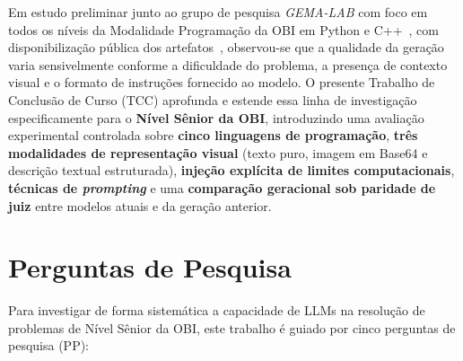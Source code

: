 Em estudo preliminar junto ao grupo de pesquisa \textit{GEMA-LAB} com foco em todos os níveis da Modalidade Programação da OBI em Python e C++~\citep{angelo2026ise}, com disponibilização pública dos artefatos~\citep{obibenchmarking2026,problems2026}, observou-se que a qualidade da geração varia sensivelmente conforme a dificuldade do problema, a presença de contexto visual e o formato de instruções fornecido ao modelo. O presente Trabalho de Conclusão de Curso (TCC) aprofunda e estende essa linha de investigação especificamente para o \textbf{Nível Sênior da OBI}, introduzindo uma avaliação experimental controlada sobre \textbf{cinco linguagens de programação}, \textbf{três modalidades de representação visual} (texto puro, imagem em Base64 e descrição textual estruturada), \textbf{injeção explícita de limites computacionais}, \textbf{técnicas de \textit{prompting}} e uma \textbf{comparação geracional sob paridade de juiz} entre modelos atuais e da geração anterior.

\section{Perguntas de Pesquisa}\label{sec:intro-rqs}

Para investigar de forma sistemática a capacidade de LLMs na resolução de problemas de Nível Sênior da OBI, este trabalho é guiado por cinco perguntas de pesquisa (PP):

